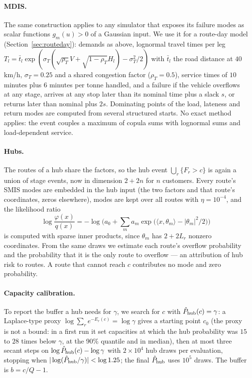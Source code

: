 \documentclass[11pt]{article}
\theoremstyle{definition}
\theoremstyle{remark}
\begin{document}
\paragraph{MDIS.} The same construction applies to any simulator that exposes
its failure modes as scalar functions $g_m(u) > 0$ of a Gaussian input. We
use it for a route-day model (Section~\ref{sec:routeday}): demands as above,
lognormal travel times per leg $T_l=\bar t_l\exp(\sigma_T(\sqrt{\rho_T}V+
\sqrt{1-\rho_T}H_l)-\sigma_T^2/2)$ with $\bar t_l$ the road distance at
$40$\,km/h, $\sigma_T=0.25$ and a shared congestion factor ($\rho_T=0.5$),
service times of $10$ minutes plus $6$ minutes per tonne handled, and a failure
if the vehicle overflows at any stage, arrives at any stop later than its
nominal time plus a slack $s$, or returns later than nominal plus $2s$.
Dominating points of the load, lateness and return modes are computed from
several structured starts. No exact method applies: the event couples a
maximum of copula sums with lognormal sums and load-dependent service.

\paragraph{Hubs.} The routes of a hub share the factors, so the hub event
$\bigcup_r\{F_r > c\}$ is again a union of stage events, now in dimension
$2+2n$ for $n$ customers. Every route's SMIS modes are embedded in the hub
input (the two factors and that route's coordinates, zeros elsewhere), modes
are kept over all routes with $\eta=10^{-4}$, and the likelihood ratio
\[
\log\frac{\varphi(x)}{q(x)} = -\log\Big(a_0+\sum_m a_m\exp\big(\langle x,\theta_m\rangle-|\theta_m|^2/2\big)\Big)
\]
is computed with sparse inner products, since $\theta_m$ has $2+2L_r$ nonzero
coordinates. From the same draws we estimate each route's overflow
probability and the probability that it is the only route to overflow --- an
attribution of hub risk to routes. A route that cannot reach $c$ contributes
no mode and zero probability.

\paragraph{Capacity calibration.} To report the buffer a hub needs for
$\gamma$, we search for $c$ with $\hat P_{\rm hub}(c)=\gamma$: a Laplace-type
proxy $\log\sum_r e^{-E_r(c)}=\log\gamma$ gives a starting point $c_0$ (the
proxy is not a bound: in a first run it set capacities at which the hub
probability was $15$ to $28$ times below $\gamma$, at the 90\% quantile and
in median), then at most
three secant steps on $\log\hat P_{\rm hub}(c)-\log\gamma$ with $2\times10^4$
hub draws per evaluation, stopping when $|\log(\hat P_{\rm hub}/\gamma)|<\log1.25$;
the final $\hat P_{\rm hub}$ uses $10^5$ draws. The buffer is $b=c/Q-1$.
\end{document}

